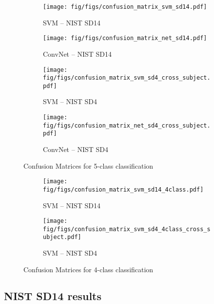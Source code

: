 \begin{figure*}[!ht]
	\begin{subfigure}[b]{0.25\textwidth}
		\centering
		\texttt{[image: fig/figs/confusion\_matrix\_svm\_sd14.pdf]}
		\caption{SVM -- NIST SD14 }
		\label{fig.cnf_matrix_5class.svm_sd14}
	\end{subfigure}%
	\begin{subfigure}[b]{0.25\textwidth}
		\centering
		\texttt{[image: fig/figs/confusion\_matrix\_net\_sd14.pdf]}
		\caption{ConvNet -- NIST SD14 }
		\label{fig.cnf_matrix_5class.net_sd14}
	\end{subfigure}%
	\begin{subfigure}[b]{0.25\textwidth}
		\centering
		\texttt{[image: fig/figs/confusion\_matrix\_svm\_sd4\_cross\_subject.pdf]}
		\caption{SVM -- NIST SD4 }
		\label{fig.cnf_matrix_5class.svm_sd4}
	\end{subfigure}%
	\begin{subfigure}[b]{0.25\textwidth}
		\centering
		\texttt{[image: fig/figs/confusion\_matrix\_net\_sd4\_cross\_subject.pdf]}
		\caption{ConvNet -- NIST SD4 }
		\label{fig.cnf_matrix_5class.net_sd4}
	\end{subfigure}
	\caption{Confusion Matrices for 5-class classification}\label{fig.cnf_matrix_5class}
\end{figure*}

\begin{figure}[!ht]
	\begin{subfigure}[b]{0.25\textwidth}
		\centering
		\texttt{[image: fig/figs/confusion\_matrix\_svm\_sd14\_4class.pdf]}
		\caption{SVM -- NIST SD14 }
		\label{fig.cnf_matrix_4class.svm_sd14}
	\end{subfigure}%
	\begin{subfigure}[b]{0.25\textwidth}
		\centering
		\texttt{[image: fig/figs/confusion\_matrix\_svm\_sd4\_4class\_cross\_subject.pdf]}
		\caption{SVM -- NIST SD4}
		\label{fig.cnf_matrix_4class.svm_sd4}
	\end{subfigure}%

	\caption{Confusion Matrices for 4-class classification}\label{fig.cnf_matrix_4class}
\end{figure}

\subsection{NIST SD14 results}
\label{sec_sd14}

